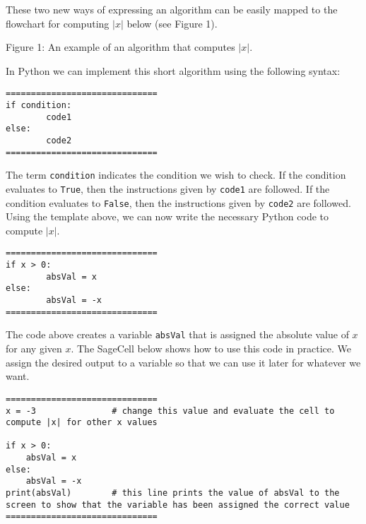 \documentclass{ximera}
\begin{document}
These two new ways of expressing an algorithm can be easily mapped to the flowchart for computing $|x|$ below (see Figure 1).

\begin{center}
\end{center}
\begin{center}
    Figure 1: An example of an algorithm that computes $|x|$.
\end{center}


In Python we can implement this short algorithm using the following syntax:

\begin{verbatim}
==============================
if condition:
        code1
else:
        code2
==============================
\end{verbatim}

The term \verb|condition| indicates the condition we wish to check. If the condition evaluates to \verb|True|, then the instructions given by \verb|code1| are followed. If the condition evaluates to \verb|False|, then the instructions given by \verb|code2| are followed. Using the template above, we can now write the necessary Python code to compute $|x|$.

\begin{verbatim}
==============================
if x > 0:
        absVal = x
else:
        absVal = -x
==============================
\end{verbatim}

The code above creates a variable \verb|absVal| that is assigned the absolute value of $x$ for any given $x$. The SageCell below shows how to use this code in practice. We assign the desired output to a variable so that we can use it later for whatever we want.

\begin{verbatim}
==============================
x = -3               # change this value and evaluate the cell to compute |x| for other x values

if x > 0:
	absVal = x
else:
	absVal = -x
print(absVal)        # this line prints the value of absVal to the screen to show that the variable has been assigned the correct value
==============================
\end{verbatim}
\end{document}
